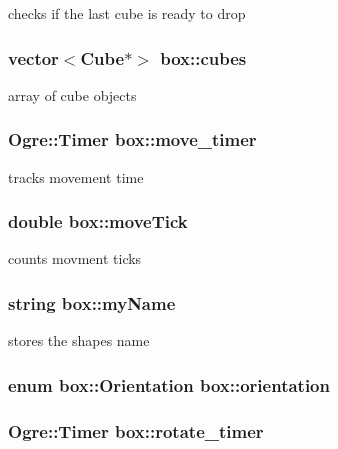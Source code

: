 checks if the last cube is ready to drop \hypertarget{classbox_a53e283c3448f79142666aedfea567b04}{
\subsubsection[{cubes}]{\setlength{\rightskip}{0pt plus 5cm}vector$<${\bf Cube}$\ast$$>$ box\-::cubes}}\label{classbox_a53e283c3448f79142666aedfea567b04}
array of cube objects \hypertarget{classbox_a5eaf149a0b9bff3ee5cfd62ad4de1a08}{
\subsubsection[{move\-\_\-timer}]{\setlength{\rightskip}{0pt plus 5cm}Ogre\-::\-Timer box\-::move\-\_\-timer}}\label{classbox_a5eaf149a0b9bff3ee5cfd62ad4de1a08}
tracks movement time \hypertarget{classbox_aa37b652252a99b368309c11eb1647811}{
\subsubsection[{move\-Tick}]{\setlength{\rightskip}{0pt plus 5cm}double box\-::move\-Tick}}\label{classbox_aa37b652252a99b368309c11eb1647811}
counts movment ticks \hypertarget{classbox_a2350aca4cfcf3a648ef649e1b5fccabe}{
\subsubsection[{my\-Name}]{\setlength{\rightskip}{0pt plus 5cm}string box\-::my\-Name}}\label{classbox_a2350aca4cfcf3a648ef649e1b5fccabe}
stores the shapes name \hypertarget{classbox_ab36d34b3d985c2631f6e4feb864675ab}{
\subsubsection[{orientation}]{\setlength{\rightskip}{0pt plus 5cm}enum {\bf box\-::\-Orientation}  box\-::orientation}}\label{classbox_ab36d34b3d985c2631f6e4feb864675ab}
\hypertarget{classbox_abd44104db5f2b13def5813ee20d27dcb}{
\subsubsection[{rotate\-\_\-timer}]{\setlength{\rightskip}{0pt plus 5cm}Ogre\-::\-Timer box\-::rotate\-\_\-timer}}\label{classbox_abd44104db5f2b13def5813ee20d27dcb}
